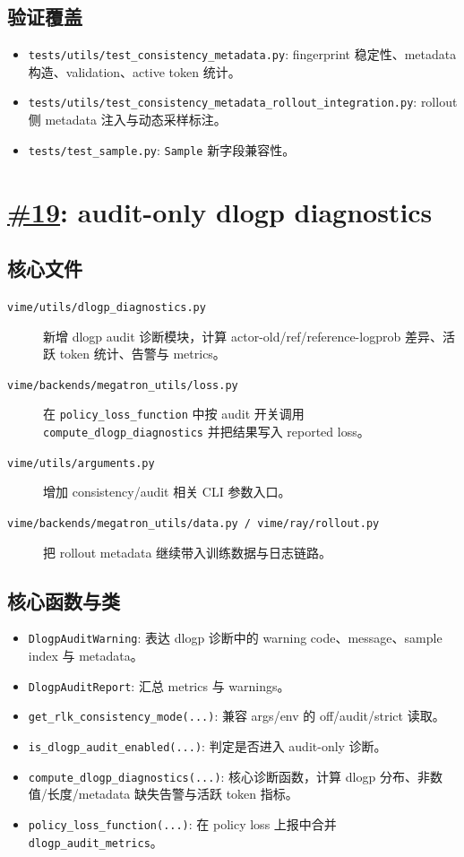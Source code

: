 \documentclass[11pt,a4paper]{ctexart}
\newcommand{\code}[1]{{\small\nolinkurl{#1}}}
\newcommand{\pr}[1]{\href{https://github.com/RL-Align/vime/pull/#1}{\##1}}
\newcommand{\fileitem}[2]{\item[\code{#1}] #2}
\begin{document}
\subsection{验证覆盖}
\begin{itemize}
  \item \code{tests/utils/test_consistency_metadata.py}: fingerprint 稳定性、metadata 构造、validation、active token 统计。
  \item \code{tests/utils/test_consistency_metadata_rollout_integration.py}: rollout 侧 metadata 注入与动态采样标注。
  \item \code{tests/test_sample.py}: \code{Sample} 新字段兼容性。
\end{itemize}

\newpage
\section{\pr{19}: audit-only dlogp diagnostics}

\subsection{核心文件}
\begin{description}
  \fileitem{vime/utils/dlogp_diagnostics.py}{新增 dlogp audit 诊断模块，计算 actor-old/ref/reference-logprob 差异、活跃 token 统计、告警与 metrics。}
  \fileitem{vime/backends/megatron_utils/loss.py}{在 \code{policy_loss_function} 中按 audit 开关调用 \code{compute_dlogp_diagnostics} 并把结果写入 reported loss。}
  \fileitem{vime/utils/arguments.py}{增加 consistency/audit 相关 CLI 参数入口。}
  \fileitem{vime/backends/megatron_utils/data.py / vime/ray/rollout.py}{把 rollout metadata 继续带入训练数据与日志链路。}
\end{description}

\subsection{核心函数与类}
\begin{itemize}
  \item \code{DlogpAuditWarning}: 表达 dlogp 诊断中的 warning code、message、sample index 与 metadata。
  \item \code{DlogpAuditReport}: 汇总 metrics 与 warnings。
  \item \code{get_rlk_consistency_mode(...)}: 兼容 args/env 的 off/audit/strict 读取。
  \item \code{is_dlogp_audit_enabled(...)}: 判定是否进入 audit-only 诊断。
  \item \code{compute_dlogp_diagnostics(...)}: 核心诊断函数，计算 dlogp 分布、非数值/长度/metadata 缺失告警与活跃 token 指标。
  \item \code{policy_loss_function(...)}: 在 policy loss 上报中合并 \code{dlogp_audit_metrics}。
\end{itemize}
\end{document}
